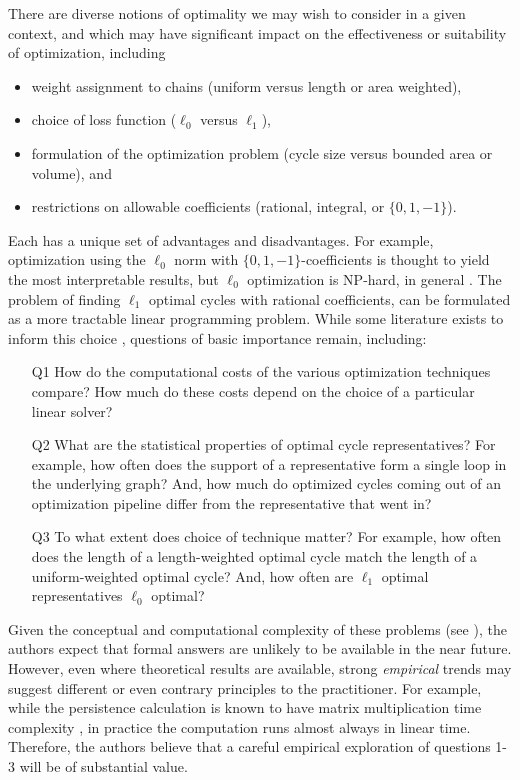 \documentclass[utf8]{formatting_stuff/frontiersFPHY}
\theoremstyle{plain}
\theoremstyle{definition}
\begin{document}
There are diverse notions of optimality we may wish to consider in a given context, and which may have significant impact on the effectiveness or suitability of  optimization, including  
\begin{itemize}
    \item weight assignment to chains (uniform versus length or area weighted), 
 \item choice of loss function ($\ell_0$ versus $\ell_1$), 
 \item formulation of the optimization problem (cycle size versus bounded area or volume), and \item restrictions on allowable coefficients (rational, integral, or $\{0,1,-1\}$).  
 \end{itemize}
 Each has a unique set of advantages and disadvantages. For example, optimization using the $\ell_0$ norm with $\{0, 1, -1\}$-coefficients is thought to yield the most interpretable results, but $\ell_0$ optimization is NP-hard, in general \cite{chenhardness}. 
The problem of finding $\ell_1$ optimal cycles with rational coefficients, can be formulated as a more tractable linear programming problem.
While some literature exists to inform this choice \cite{dey2011optimal,Escolar2016,Obayashi2018}, questions of basic importance remain, including: 

\begin{enumerate}
  \item[Q1] How do the computational costs of the various optimization techniques compare? How much do these costs depend on the choice of a particular linear solver? 
  \item[Q2] What are the statistical properties of optimal cycle representatives? For example,  how often does the support of a representative form a single loop in the underlying graph? And,  how much do optimized cycles coming out of an optimization pipeline differ from the representative that went in?     
    \item[Q3] To what extent does choice of technique matter? For example, how often does the length of a length-weighted optimal cycle match the length of a uniform-weighted optimal cycle? 
    And, how often are $\ell_1$ optimal representatives $\ell_0$ optimal? 
\end{enumerate}

Given the conceptual and computational complexity of these problems (see \cite{chenhardness}), the authors expect that formal answers are unlikely to be available in the near future. However, even where theoretical results are available, strong \emph{empirical} trends may suggest different or even contrary principles to the practitioner. For example, while the persistence calculation is known to have matrix multiplication time complexity  \cite{primoz}, in practice the computation runs almost always in linear time. Therefore, the authors believe that a careful empirical exploration of questions 1-3 will be of substantial value. 
\end{document}
